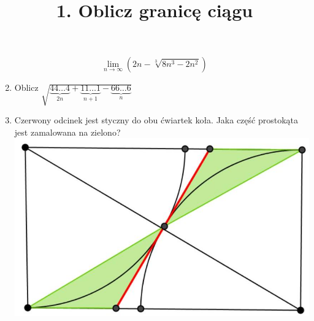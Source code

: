 \documentclass[10pt]{article}
\title{1. Oblicz granicę ciągu }
\author{}
\date{}
\begin{document}
\maketitle
\[
\lim _{n \rightarrow \infty}\left(2 n-\sqrt[3]{8 n^{3}-2 n^{2}}\right)
\]

\begin{enumerate}
  \setcounter{enumi}{1}
  \item Oblicz \(\sqrt{\underbrace{44 \ldots 4}_{2 n}+\underbrace{11 \ldots 1}_{n+1}-\underbrace{66 \ldots 6}_{n}}\)
  \item Czerwony odcinek jest styczny do obu ćwiartek koła. Jaka część prostokąta jest zamalowana na zielono?\\
\includegraphics[max width=\textwidth, center]{2024_11_21_e6768d6d37bcac47327bg-1}
\end{enumerate}
\end{document}
